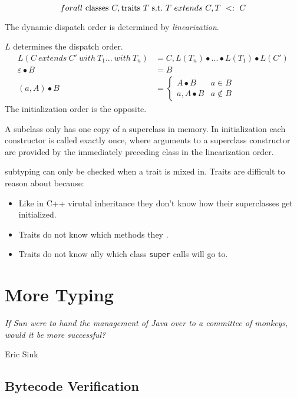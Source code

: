 \documentclass{article}
\begin{document}
\begin{remark}\label{linearremark}
$$forall ~ \text{classes} ~ C, \text{traits} ~ T ~ \text{s.t.} ~ T ~ extends ~ C, T ~ <: ~ C$$
\end{remark}

The dynamic dispatch order is determined by \textit{linearization}.

\begin{definition}[Linearization]
$L$ determines the dispatch order.
\begin{align} 
L(C ~ extends ~ C' ~ with ~ T_1 ... ~ with ~ T_n) &=  C, L(T_n) \bullet ... \bullet L(T_1) \bullet L(C') \\
\varepsilon \bullet B &= B \\
(a, A) \bullet B &=
\begin{cases}
A \bullet B & a \in B \\
a, A \bullet B & a \notin B
\end{cases}
\end{align}
The initialization order is the opposite.
\end{definition}


A subclass only has one copy of a superclass in memory. In initialization each constructor is called exactly once, where arguments to a superclass constructor are provided by the immediately preceding class in the linearization order.

\behavioral{} subtyping can only be checked when a trait is mixed in. Traits are difficult to reason about because:
\begin{itemize}
\item Like in C++ virutal inheritance they don't know how their superclasses get initialized.
\item Traits do not know which methods they \override{}.
\item Traits do not know \static{}ally which class \texttt{super} calls will go to.
\end{itemize}

\section{More Typing}

\epigraph{\itshape If Sun were to hand the management of Java over to a committee of monkeys, would it be more successful?}{Eric Sink}

\subsection{Bytecode Verification}
\end{document}
